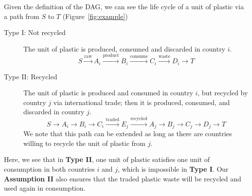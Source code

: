 Given the definition of the DAG, we can see the life cycle of a unit of plastic via a path from $S$ to $T$ (Figure~\ref{fig:example})
\begin{description}
    \item[Type I: Not recycled] The unit of plastic is produced, consumed and discarded in country $i$.
    $$S \xrightarrow{\mathrm{raw}} A_i \xrightarrow{\mathrm{product}} B_i \xrightarrow{\mathrm{consume}} C_i \xrightarrow{\mathrm{waste}} D_i \to T$$
    \item[Type II: Recycled] The unit of plastic is produced and consumed in country $i$, but recycled by country $j$ via international trade; then it is produced, consumed, and discarded in country $j$.
    $$S \to A_i \to B_i \to C_i \xrightarrow{\mathrm{traded}} E_j \xrightarrow{\mathrm{recycled}} A_j \to B_j \to C_j \to D_j \to T$$
    We note that this path can be extended as long as there are countries willing to recycle the unit of plastic from $j$.
\end{description}
Here, we see that in \textbf{Type II}, one unit of plastic satisfies one unit of consumption in both countries $i$ and $j$, which is impossible in \textbf{Type I}. Our \textbf{Assumption II} also ensures that the traded plastic waste will be recycled and used again in consumption.

